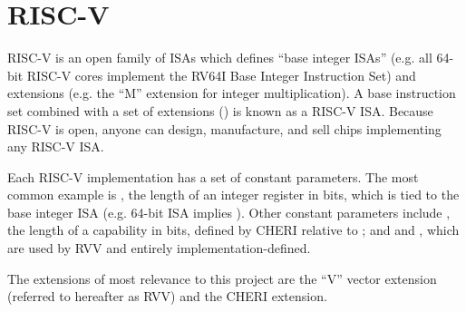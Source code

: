 \section{RISC-V}\label{chap:bg:sec:rvv}
RISC-V is an open family of ISAs which defines ``base integer ISAs'' (e.g. all 64-bit RISC-V cores implement the RV64I Base Integer Instruction Set) and extensions (e.g. the ``M'' extension for integer multiplication).
A base instruction set combined with a set of extensions () is known as a RISC-V ISA.
Because RISC-V is open, anyone can design, manufacture, and sell chips implementing any RISC-V ISA.

Each RISC-V implementation has a set of constant parameters.
The most common example is , the length of an integer register in bits, which is tied to the base integer ISA (e.g. 64-bit ISA implies ).
Other constant parameters include , the length of a capability in bits, defined by CHERI relative to ; and  and , which are used by RVV and entirely implementation-defined.

The extensions of most relevance to this project are the ``V'' vector extension (referred to hereafter as RVV) and the CHERI extension.
